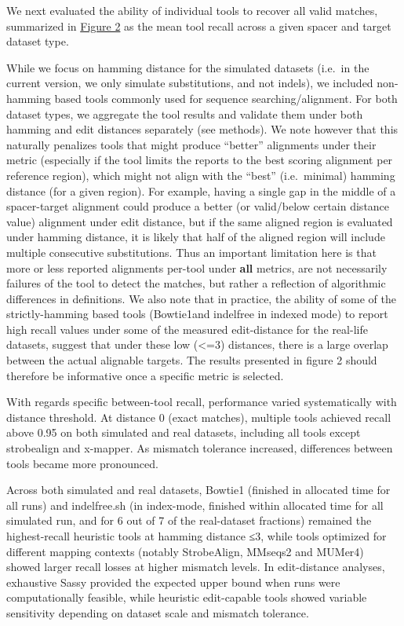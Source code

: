 \documentclass[
]{article}
\begin{document}
We next evaluated the ability of individual tools to recover all valid
matches, summarized in \hyperref[fig-tool-performance]{Figure 2} as the
mean tool recall across a given spacer and target dataset type.

While we focus on hamming distance for the simulated datasets (i.e.~in
the current version, we only simulate substitutions, and not indels), we
included non-hamming based tools commonly used for sequence
searching/alignment. For both dataset types, we aggregate the tool
results and validate them under both hamming and edit distances
separately (see methods). We note however that this naturally penalizes
tools that might produce ``better'' alignments under their metric
(especially if the tool limits the reports to the best scoring alignment
per reference region), which might not align with the ``best''
(i.e.~minimal) hamming distance (for a given region). For example,
having a single gap in the middle of a spacer-target alignment could
produce a better (or valid/below certain distance value) alignment under
edit distance, but if the same aligned region is evaluated under hamming
distance, it is likely that half of the aligned region will include
multiple consecutive substitutions. Thus an important limitation here is
that more or less reported alignments per-tool under \textbf{all}
metrics, are not necessarily failures of the tool to detect the matches,
but rather a reflection of algorithmic differences in definitions. We
also note that in practice, the ability of some of the strictly-hamming
based tools (Bowtie1and indelfree in indexed mode) to report high recall
values under some of the measured edit-distance for the real-life
datasets, suggest that under these low (\textless=3) distances, there is
a large overlap between the actual alignable targets. The results
presented in figure 2 should therefore be informative once a specific
metric is selected.

With regards specific between-tool recall, performance varied
systematically with distance threshold. At distance 0 (exact matches),
multiple tools achieved recall above 0.95 on both simulated and real
datasets, including all tools except strobealign and x-mapper. As
mismatch tolerance increased, differences between tools became more
pronounced.

Across both simulated and real datasets, Bowtie1 (finished in allocated
time for all runs) and indelfree.sh (in index-mode, finished within
allocated time for all simulated run, and for 6 out of 7 of the
real-dataset fractions) remained the highest-recall heuristic tools at
hamming distance ≤3, while tools optimized for different mapping
contexts (notably StrobeAlign, MMseqs2 and MUMer4) showed larger recall
losses at higher mismatch levels. In edit-distance analyses, exhaustive
Sassy provided the expected upper bound when runs were computationally
feasible, while heuristic edit-capable tools showed variable sensitivity
depending on dataset scale and mismatch tolerance.
\end{document}

